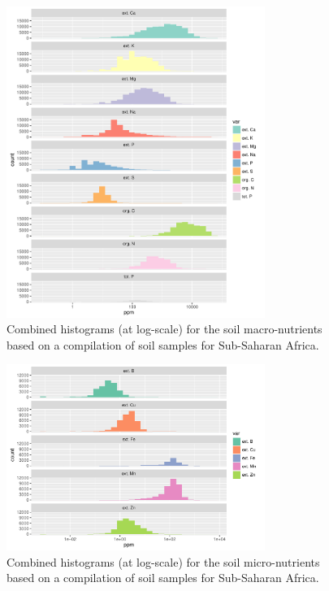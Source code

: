 \begin{linenumbers}
\begin{figure}[!hbt]
\includegraphics[width=0.75\textwidth]{Fig_AfNutrients_histograms_macro.pdf}
\caption{Combined histograms (at log-scale) for the soil macro-nutrients based on a compilation of soil samples for Sub-Saharan Africa.}
\label{fig:histograms1}
\end{figure}

\begin{figure}[!hbt]
\includegraphics[width=0.75\textwidth]{Fig_AfNutrients_histograms_micro.pdf}
\caption{Combined histograms (at log-scale) for the soil micro-nutrients based on a compilation of soil samples for Sub-Saharan Africa.}
\label{fig:histograms2}
\end{figure}


\end{linenumbers}
